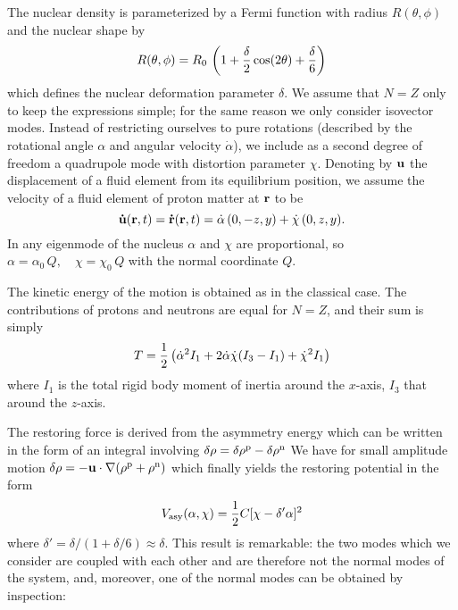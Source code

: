 \documentclass[fleqn,twocolumn,a4paper]{ikpar}
\begin{document}
The nuclear density is parameterized by a Fermi function with radius
$R(\theta,\phi)$
and the nuclear shape by
%
\begin{equation} R(\theta, \phi) =  R_0 \,\left(1+{\delta\over 2} \cos (2\theta) +{\delta
\over 6}\right)
\label{(13)}\end{equation}
which defines the nuclear deformation parameter $\delta$.
We assume that $N=Z$ only to keep the expressions simple;
for the same reason we only consider isovector modes.
Instead of restricting ourselves to pure rotations (described by the
rotational angle $\alpha$ and angular velocity $\dot\alpha$),
we include as a second degree of
freedom a quadru\-pole mode with distortion parameter $\chi$.
Denoting by ${\bf u}$ the displacement of a fluid element from
its equilibrium position, we assume
the velocity of a fluid element of proton matter at
${\bf  r}$ to be
\begin{equation}
{\bf \dot u}({\bf r},t)={\bf  \dot r}({\bf  r},t)
= \dot\alpha\,(0,-z,y) + \dot\chi\,(0,z,y).
\label{(2)}\end{equation}
In any eigenmode of the nucleus $\alpha$ and $\chi$ are proportional, so
$\alpha=\alpha_0\,Q,\quad \chi=\chi_0\,Q
$
with the normal
coordinate $Q$.
\par
The kinetic energy of the
motion is obtained as in the classical case.
The contributions of protons and
neutrons are equal for $N=Z$, and their sum is simply
\begin{equation}
T={1\over 2} \left (\dot\alpha^2 I_1 + 2\dot\alpha\dot\chi (I_3-I_1)
+ \dot\chi^2 I_1\right )
\label{(9)}\end{equation}
where $I_1$ is the total rigid body
moment of inertia around the $x$-axis, $I_3$ that
around the $z$-axis.\par
The restoring force is derived from the asymmetry energy which
can be written \cite{r7,r20} in the form of an integral involving
$\delta\rho = \delta\rho^{\rm p} -\delta\rho^{\rm n}$
We have for small amplitude motion $\delta\rho
=-{\bf  u}
\cdot \nabla (\rho^{\rm p}+\rho^{\rm n}) %
$
which finally yields the restoring potential in the form
\begin{equation}V_{\rm asy}(\alpha,\chi)=
{1\over 2}C[\chi
-\delta^\prime\alpha]^2\label{(17)}\end{equation}
where  $\delta'=\delta/(1+\delta/6)\approx\delta$.
This result is remarkable:
the two modes which we consider are coupled
with each other and are therefore not the normal modes of the system,
and, moreover, one of the normal modes can be obtained by inspection:
\end{document}
